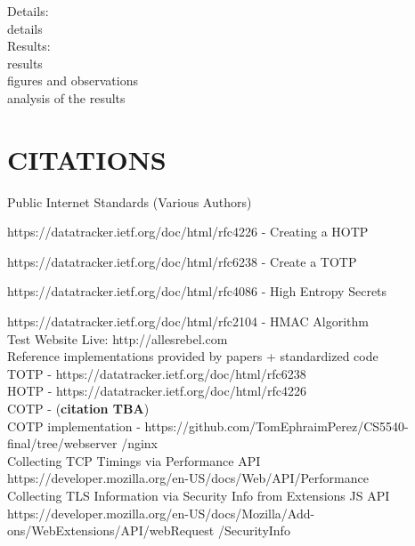 \documentclass[a4paper, 11pt]{article} 				%
\begin{document}
\noindent
Details:\\
details\\

\noindent
Results:\\
results\\
figures and observations\\
analysis of the results\\





\section{CITATIONS } 	%
\noindent
Public Internet Standards (Various Authors)

\noindent
https://datatracker.ietf.org/doc/html/rfc4226 - Creating a HOTP

\noindent
https://datatracker.ietf.org/doc/html/rfc6238 - Create a TOTP 

\noindent
https://datatracker.ietf.org/doc/html/rfc4086 - High Entropy Secrets

\noindent
https://datatracker.ietf.org/doc/html/rfc2104 - HMAC Algorithm\\

\noindent
Test Website Live: http://allesrebel.com\\ 

\noindent
Reference implementations provided by papers + standardized code\\
TOTP - https://datatracker.ietf.org/doc/html/rfc6238\\
HOTP - https://datatracker.ietf.org/doc/html/rfc4226 \\
COTP - (\textbf{citation TBA})\\
COTP implementation - https://github.com/TomEphraimPerez/CS5540-final/tree/webserver /nginx\\

\noindent
Collecting TCP Timings via Performance API\\
https://developer.mozilla.org/en-US/docs/Web/API/Performance\\
Collecting TLS Information via Security Info from Extensions JS API\\
https://developer.mozilla.org/en-US/docs/Mozilla/Add-ons/WebExtensions/API/webRequest /SecurityInfo\\
\end{document}
